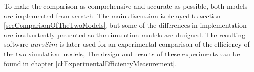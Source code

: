 \documentclass[b5paper,12 pt]{report}
\begin{document}
 
		To make the comparison as comprehensive and accurate as possible, both models are implemented from scratch.
 		The main discussion is delayed to section \ref{secComparisonOfTheTwoModels},
 			but some of the differences in implementation are inadvertently presented as the simulation models are designed. 
		The resulting software $auroSim$ is later used for an experimental comparison of the efficiency of the two simulation models,
 		The design and results of these experiments can be found in chapter \ref{chExperimentalEfficiencyMeasurement}.
		
\end{document}
